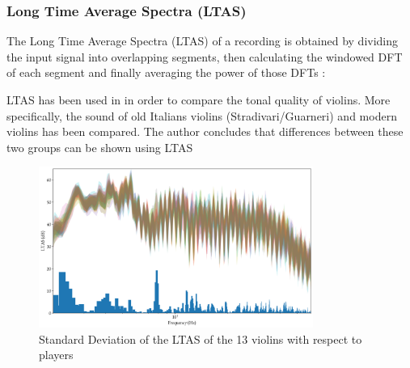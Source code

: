 \documentclass[letterpaper,11pt,leqno]{article}
\begin{document}
\subsubsection{Long Time Average Spectra (LTAS)}{

The Long Time Average Spectra (LTAS) of a recording is obtained by dividing the input signal into overlapping segments, then calculating the windowed DFT of each segment and finally averaging the power of those DFTs :

\begin{figure}[!h]
\end{figure}

LTAS has been used in \cite{buenCOMPARINGSOUNDGOLDEN2005} in order to compare the tonal quality of violins. More specifically, the sound of old Italians violins (Stradivari/Guarneri) and modern violins has been compared. The author concludes that differences between these two groups can be shown using LTAS

\begin{figure}[h]
	\includegraphics[width=0.8\textwidth]{../figures/ltas.png}
	\caption{Standard Deviation of the LTAS of the 13 violins with respect to players}
\end{figure}
}
\end{document}
